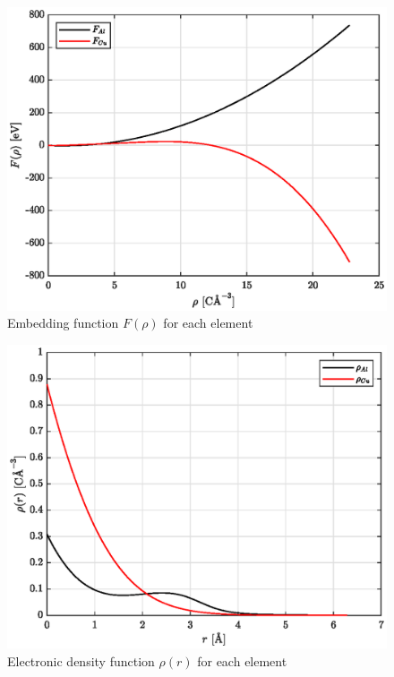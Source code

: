 \documentclass{article}
\begin{document}
\begin{figure}[h!]
	\centering
	\includegraphics[scale=0.6]{Figures/F_AlCu.eps}
	\caption{Embedding function $F(\rho)$ for each element}
\end{figure}
\begin{figure}[h!]
	\centering
	\includegraphics[scale=0.6]{Figures/rho_AlCu.eps}
	\caption{Electronic density function $\rho(r)$ for each element}
\end{figure}
\end{document}
